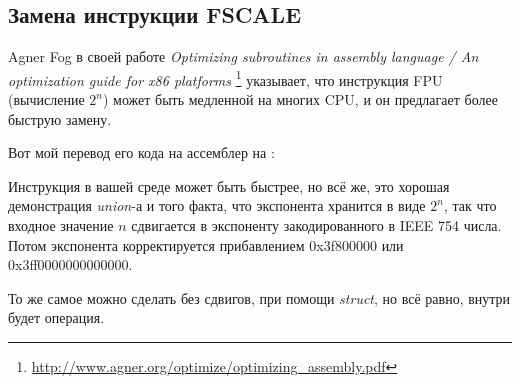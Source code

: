 \subsection{Замена инструкции FSCALE}

Agner Fog в своей работе \emph{Optimizing subroutines in assembly language / An optimization guide for x86 platforms}
\footnote{\url{http://www.agner.org/optimize/optimizing_assembly.pdf}} указывает, что инструкция \ac{FPU} 
(вычисление $2^n$) может быть медленной на многих CPU, и он предлагает более быструю замену.

Вот мой перевод его кода на ассемблер на \CCpp:



Инструкция  в вашей среде может быть быстрее, но всё же, это хорошая демонстрация \emph{union}-а и того факта,
что экспонента хранится в виде $2^n$,
так что входное значение $n$ сдвигается в экспоненту закодированного в IEEE 754 числа.
Потом экспонента корректируется прибавлением 0x3f800000 или 0x3ff0000000000000.

То же самое можно сделать без сдвигов, при помощи \emph{struct}, но всё равно, внутри будет операция.

